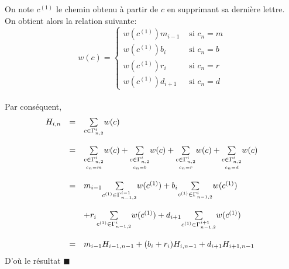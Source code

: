 On note $c^{(1)}$ le chemin obtenu à partir de $c$ en
supprimant sa dernière lettre. \\
On obtient alors la relation suivante:
$$
	w(c) = \begin{cases}
		w(c^{(1)})m_{i-1} & \text{ si }c_{n}=m \\
		w(c^{(1)})b_{i}   & \text{ si }c_{n}=b \\
		w(c^{(1)})r_{i}   & \text{ si }c_{n}=r \\
		w(c^{(1)})d_{i+1} & \text{ si }c_{n}=d
	\end{cases}
$$\vspace{5pt}\\
Par conséquent,
\[
	\begin{array}{r c l}
		H_{i,n} & =       & \underset{c \in \Gamma_{n,2}^{i}}{\sum}w(c)                                                                                       \\
		        & \text{} &                                                                                                                                   \\
		        & =       & \underset{\scriptstyle\underset{c_{n}=m}{ c \in \Gamma_{n,2}^{i}}}{\sum}w(c)+
		\underset{\scriptstyle \underset{c_{n}=b}{c\in \Gamma_{n,2}^{i}}}{\sum}w(c)+
		\underset{\scriptstyle \underset{c_{n}=r}{c\in \Gamma_{n,2}^{i}}}{\sum}w(c)+
		\underset{\scriptstyle \underset{c_{n}=d}{c\in \Gamma_{n,2}^{i}}}{\sum}w(c)                                                                           \\
		        & \text{} &                                                                                                                                   \\
		        & =       & m_{i-1}\underset{c^{(1)}\in \Gamma_{n-1,2}^{i-1}}{\sum}w(c^{(1)})+b_{i}\underset{c^{(1)}
		\in \Gamma_{n-1,2}^{i}}{\sum}w(c^{(1)})                                                                                                               \\
		        & \text{} &                                                                                                                                   \\
		        & \text{} & +r_{i}\underset{c^{(1)}\in \Gamma_{n-1,2}^{i}}{\sum}w(c^{(1)})+d_{i+1}\underset{c^{(1)} \in \Gamma_{n-1,2}^{i+1}}{\sum}w(c^{(1)}) \\
		        & \text{} &                                                                                                                                   \\
		        & =       & m_{i-1}H_{i-1,n-1}+(b_{i}+r_{i})H_{i,n-1}+d_{i+1}H_{i+1,n-1}\hspace{5pt}
	\end{array}
\]D'où le résultat $\blacksquare$\vspace{15pt}\\
